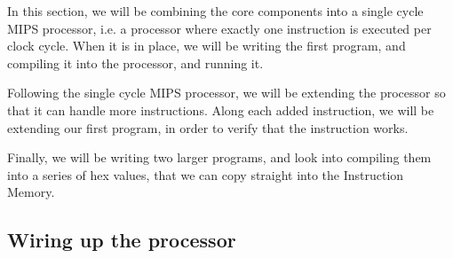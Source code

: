 In this section, we will be combining the core components into a single cycle
MIPS processor, i.e. a processor where exactly one instruction is executed per
clock cycle. When it is in place, we will be writing the first program, and
compiling it into the processor, and running it.

Following the single cycle MIPS processor, we will be extending
the processor so that it can handle more instructions. Along each added
instruction, we will be extending our first program, in order to verify that
the instruction works.

Finally, we will be writing two larger programs, and look into compiling them
into a series of hex values, that we can copy straight into the Instruction
Memory.

\subsection{Wiring up the processor}
